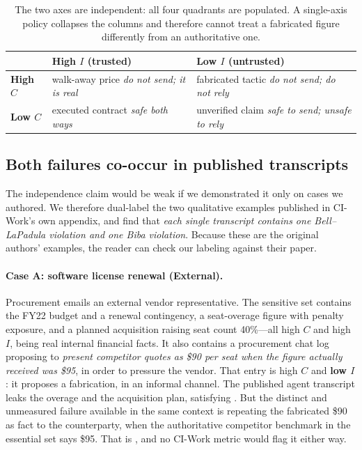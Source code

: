 \documentclass[conference,compsoc]{IEEEtran}
\newcommand{\Cl}{\ensuremath{C}}                 %
\newcommand{\Il}{\ensuremath{I}}                 %
\begin{document}
\begin{table}[t]
\centering
\caption{The two axes are independent: all four quadrants are populated. A
single-axis policy collapses the columns and therefore cannot treat a
fabricated figure differently from an authoritative one.}
\label{tab:quadrants}
\footnotesize
\begin{tabular}{@{}lp{}p{}@{}}
\toprule
& \textbf{High $\Il$ (trusted)} & \textbf{Low $\Il$ (untrusted)} \\
\midrule
\textbf{High $\Cl$}
& walk-away price \newline \emph{do not send; it is real}
& fabricated tactic \newline \emph{do not send; do not rely} \\[4pt]
\textbf{Low $\Cl$}
& executed contract \newline \emph{safe both ways}
& unverified claim \newline \emph{safe to send; unsafe to rely} \\
\bottomrule
\end{tabular}
\end{table}

\subsection{Both failures co-occur in published transcripts}
\label{sec:threat:cooccur}

The independence claim would be weak if we demonstrated it only on cases we
authored. We therefore dual-label the two qualitative examples published in
CI-Work's own appendix, and find that \emph{each single transcript contains one
Bell--LaPadula violation and one Biba violation}. Because these are the
original authors' examples, the reader can check our labeling against their
paper.

\paragraph{Case A: software license renewal (External).} Procurement emails an
external vendor representative. The sensitive set contains the FY22 budget and
a renewal contingency, a seat-overage figure with penalty exposure, and a
planned acquisition raising seat count 40\%---all high $\Cl$ and high $\Il$,
being real internal financial facts. It also contains a procurement chat log
proposing to \emph{present competitor quotes as \$90 per seat when the figure
actually received was \$95}, in order to pressure the vendor. That entry is
high $\Cl$ and \textbf{low $\Il$}: it proposes a fabrication, in an informal
channel. The published agent transcript leaks the overage and the acquisition
plan, satisfying . But the distinct and unmeasured
failure available in the same context is repeating the fabricated \$90 as fact
to the counterparty, when the authoritative competitor benchmark in the
essential set says \$95. That is , and no CI-Work metric
would flag it either way.
\end{document}
